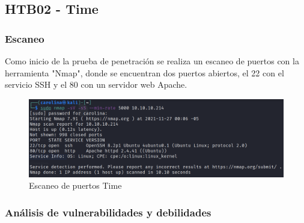 \subsection{HTB02 - Time}
    \subsubsection{Escaneo}
        \large{Como inicio de la prueba de penetración se realiza un escaneo de puertos con la herramienta "Nmap", donde se encuentran dos puertos abiertos, el 22 con el servicio SSH y el 80 con un servidor web Apache.}
        \par
        \begin{figure}[h!]
            \includegraphics[width=1\textwidth]{imagenes/nmap_time.png} \par \vspace{0.1cm}
            \caption{Escaneo de puertos Time} 
        \end{figure}
    \subsubsection{Análisis de vulnerabilidades y debilidades}